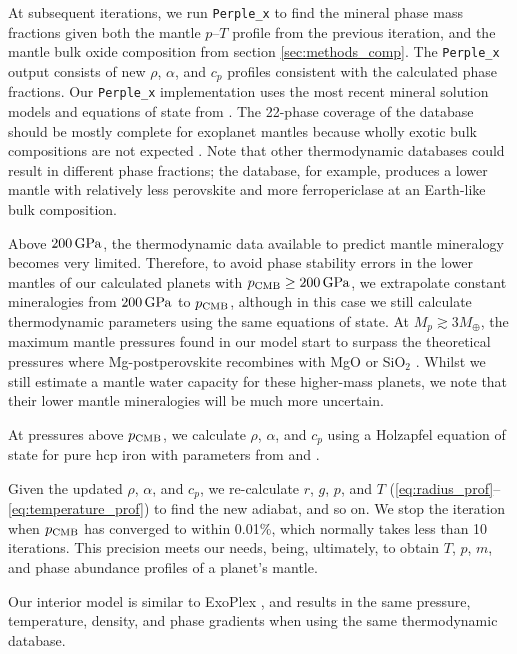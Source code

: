 \documentclass[fleqn,usenatbib]{mnras}
\begin{document}
At subsequent iterations, we run {\tt Perple\_x} to find the mineral phase mass fractions given both the mantle $p$--$T$ profile from the previous iteration, and the mantle bulk oxide composition from section \ref{sec:methods_comp}. The {\tt Perple\_x} output consists of new $\rho$, $\alpha$, and $c_p$ profiles consistent with the calculated phase fractions. Our {\tt Perple\_x} implementation uses the most recent mineral solution models and equations of state from \citet{stixrude_thermal_2022}. The 22-phase coverage of the \citet{stixrude_thermal_2022} database should be mostly complete for exoplanet mantles because wholly exotic bulk compositions are not expected \citep{putirka_composition_2019}. Note that other thermodynamic databases could result in different phase fractions; the \citet{stixrude_thermodynamics_2011} database, for example, produces a lower mantle with relatively less perovskite and more ferropericlase at an Earth-like bulk composition.

Above $200\,{\rm GPa}$, the thermodynamic data available to predict mantle mineralogy becomes very limited. Therefore, to avoid phase stability errors in the lower mantles of our calculated planets with $p_{\rm CMB} \ge 200\,{\rm GPa}$, we extrapolate constant mineralogies from $200\,{\rm GPa}$ to $p_{\rm CMB}$, although in this case we still calculate thermodynamic parameters using the same equations of state. At $M_p \gtrsim 3 M_\oplus$, the maximum mantle pressures found in our model start to surpass the theoretical pressures where Mg-postperovskite recombines with MgO or SiO$_2$ \citep{umemoto_phase_2017}. Whilst we still estimate a mantle water capacity for these higher-mass planets, we note that their lower mantle mineralogies will be much more uncertain. 

At pressures above $p_{\rm CMB}$, we calculate $\rho$, $\alpha$, and $c_p$ using a Holzapfel equation of state for pure hcp iron with parameters from \citet{bouchet_ab_2013} and \citet{hakim_new_2018}. 

Given the updated $\rho$, $\alpha$, and $c_p$, we re-calculate $r$, $g$, $p$, and $T$ (\ref{eq:radius_prof}--\ref{eq:temperature_prof}) to find the new adiabat, and so on. We stop the iteration when $p_{\rm CMB}$ has converged to within 0.01\%, which normally takes less than 10 iterations. This precision meets our needs, being, ultimately, to obtain $T$, $p$, $m$, and phase abundance profiles of a planet's mantle.


Our interior model is similar to ExoPlex \citep{unterborn_inward_2018}, and results in the same pressure, temperature, density, and phase gradients when using the same thermodynamic database.
\end{document}

